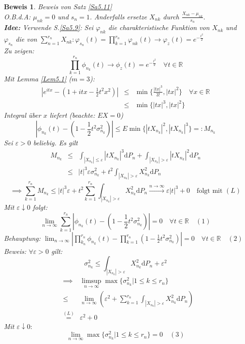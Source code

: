 \documentclass[a4paper,11pt]{scrbook}
\newcommand{\R}{{\mathbb R}}
\newcommand{\eps}{\varepsilon}
\def\folgt{\ensuremath{\implies}}
\def\d{\mbox{d}}
\theoremstyle{nonumberplain}
\newtheorem{Bew}{Beweis}
\begin{document}
\begin{Bew}
Beweis von Satz \ref{Sa5.11} \\
O.B.d.A: $\mu_{nk}=0$ und $s_n=1$. Anderfalls ersetze $X_{nk}$ durch $\frac{X_{nk}-\mu_{nk}}{s_n}.$\\
\textbf{Idee:} Verwende S.\ref{Sa5.9}: Sei $\varphi_{nk}$ die charakteristische Funktion von $X_{nk}$ und $\varphi_{s_n}$ die von $\sum_{n=1}^{r_n} X_{nk}: \varphi_{s_n}(t) = \prod_{k=1}^{r_n} \varphi_{nk}(t) \rightarrow \varphi_z(t) = e^{-\frac{t^2}{2}}$ \\
Zu zeigen:
$$\prod^{r_n}_{k=1}\phi_{n_k}(t)\to\phi_z(t)=e^{-\frac {t^2} 2}\quad\forall t\in\R$$
Mit Lemma \ref{Lem5.1} ($m=3$):
\begin{eqnarray*}
\left| e^{itx} - (1+itx-\frac 1 2 t^2 x^2)\right| &\le&\min\{\frac{|tx|^3}{3!}, |tx|^2\}\quad\forall x\in\R\\
&\le&\min\{|tx|^3, |tx|^2\}
\end{eqnarray*}
Integral über $x$ liefert (beachte: $EX=0$)
$$\left|\phi_{n_k}(t) - ( 1- \frac 1 2 t^2\sigma_{n_k}^2)\right|\le E\min\{|tX_{n_k}|^2, |tX_{n_k}|^3\} =: M_{n_k}$$
Sei $\eps>0$ beliebig. Es gilt
\begin{eqnarray*}
M_{n_k} &\le& \int_{|X_{n_k}|\le\eps}|tX_{n_k}|^3\d P_n + \int_{|X_{n_k}|>\eps}|tX_{n_k}|^2\d P_n\\
&\le& |t|^3\eps\sigma_{n_k}^2 + t^2\int_{|X_{n_k}|>\eps}X_{n_k}^2\d P_n
\end{eqnarray*}
$$\folgt\sum_{k=1}^{r_n}M_{n_k}\le|t|^3\eps + t^2\sum_{k=1}^{r_n}\int_{|X_{n_k}|>\eps}X_{n_k}^2\d P_n \stackrel{n\to\infty}{\to}\eps|t|^3 + 0 \quad\text{folgt mit }(L)$$
Mit $\eps\downarrow 0$ folgt:
$$\lim_{n\to\infty}\sum_{k=1}^{r_n}\left|\phi_{n_k}(t)-(1-\frac 1 2 t^2\sigma_{n_k}^2)\right| = 0 \quad\forall t\in\R\quad (1)$$
Behauptung: $\lim_{n\to\infty}\left|\prod_{k_n}^{r_n}\phi_{n_k}(t) - \prod_{k=1}^{r_n}(1-\frac 1 2 t^2\sigma_{n_k}^2)\right|=0\quad\forall t\in\R\quad (2)$\\
Beweis: $\forall\eps>0$ gilt:
$$\sigma_{n_k}^2\le\int_{|X_{n_k}|>\eps}X_{n_k}^2\d P_n + \eps^2$$
\begin{eqnarray*}
&\folgt& \limsup_{n\to\infty}\max\{\sigma_{n_k}^2|1\le k\le r_n\} \\
&\le&\lim_{n\to\infty}\left(\eps^2+\sum_{k=1}^{r_n}\int_{|X_{n_k}|>\eps}X_{n_k}^2\d P_n\right)\\
&\stackrel{(L)}{=}&\eps^2 + 0
\end{eqnarray*}
Mit $\eps\downarrow 0:$
$$\lim_{n\to\infty}\max\{\sigma_{n_k}^2|1\le k\le r_n\} = 0\quad (3)$$

\end{Bew}
\end{document}
